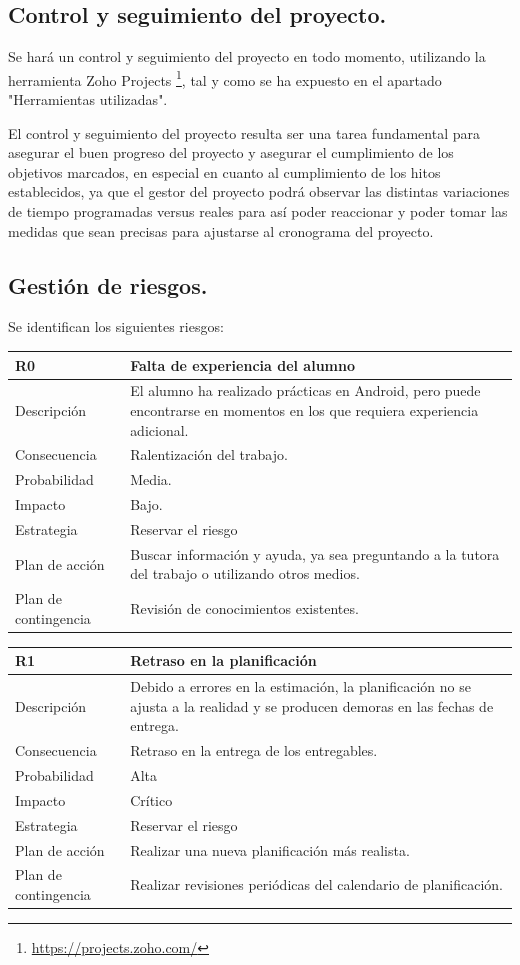 \documentclass[twoside]{report}
\newcommand\addrow[2]{#1 &#2\\ }
\newcommand\addheading[2]{#1 &#2\\ \hline}
\newcommand\tabularhead{\begin{tabular}{lp{0.7\textwidth}}
\hline
}
\newenvironment{risk}{\tabularhead}
{\hline\end{tabular}}
\begin{document}
\subsection{Control y seguimiento del proyecto.}

Se hará un control y seguimiento del proyecto en todo momento, utilizando la herramienta Zoho Projects \footnote{\url{https://projects.zoho.com/}}, tal y como se ha expuesto en el apartado "Herramientas utilizadas".

El control y seguimiento del proyecto resulta ser una tarea fundamental para asegurar el buen progreso del proyecto y asegurar el cumplimiento de los objetivos marcados, en especial en cuanto al cumplimiento de los hitos establecidos, ya que el gestor del proyecto podrá observar las distintas variaciones de tiempo programadas versus reales para así poder reaccionar y poder tomar las medidas que sean precisas para ajustarse al cronograma del proyecto.

\subsection{Gestión de riesgos.}

Se identifican los siguientes riesgos:

\begin{risk}
  \addheading{R0}{Falta de experiencia del alumno}
  \addrow{Descripción}{El alumno ha realizado prácticas en Android, pero puede encontrarse en momentos en los que requiera experiencia adicional.}
  \addrow{Consecuencia}{Ralentización del trabajo.}
  \addrow{Probabilidad}{Media.}
  \addrow{Impacto}{Bajo.}
  \addrow{Estrategia}{Reservar el riesgo}
  \addrow{Plan de acción}{Buscar información y ayuda, ya sea preguntando a la tutora del trabajo o utilizando otros medios.}
  \addrow{Plan de contingencia}{Revisión de conocimientos existentes.}
\end{risk}

\begin{risk}
  \addheading{R1}{Retraso en la planificación}
  \addrow{Descripción}{Debido a errores en la estimación, la planificación no se ajusta a la realidad y se producen demoras en las fechas de entrega.}
  \addrow{Consecuencia}{Retraso en la entrega de los entregables.}
  \addrow{Probabilidad}{Alta }
  \addrow{Impacto}{Crítico}
  \addrow{Estrategia}{Reservar el riesgo}
  \addrow{Plan de acción}{Realizar una nueva planificación más realista. }
  \addrow{Plan de contingencia}{Realizar revisiones periódicas del calendario de planificación.}
\end{risk}
\end{document}
